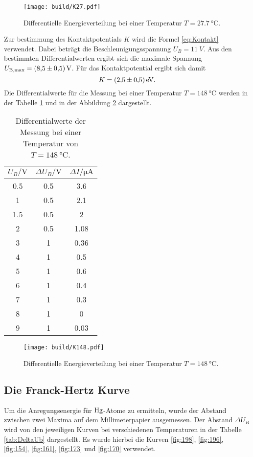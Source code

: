 \begin{figure}[H]
    \centering
    \texttt{[image: build/K27.pdf]}
    \caption{Differentielle Energieverteilung bei einer Temperatur $T = \qty{27.7}{\degreeCelsius}$.}
    \label{fig:K27}
\end{figure}
Zur bestimmung des Kontaktpotentials $K$ wird die Formel \ref{eq:Kontakt} verwendet.
Dabei beträgt die Beschleunigungsspannung $U_B = \qty{11}{V}$.
Aus den bestimmten Differentialwerten ergibt sich die maximale Spannung $U_\text{B,max} = \qty{8.5 \pm 0.5}{V}$.
Für das Kontaktpotential ergibt sich damit 
\begin{equation*}
    K = \qty{2.5 \pm 0.5}{eV}.
\end{equation*}
Die Differentialwerte für die Messung bei einer Temperatur $T = \qty{148}{\degreeCelsius}$ werden in der Tabelle \ref{tab:148} und in der Abbildung \ref{fig:K148} 
dargestellt.
\begin{table}[H]
    \centering
    \caption{Differentialwerte der Messung bei einer Temperatur von $T = \qty{148}{\degreeCelsius}$.}
    \label{tab:148}
    \begin{tabular}{c c c}
        \toprule
        $U_B / \unit{\volt}$ & $\Delta U_B/\unit{\volt}$ & $\Delta I/\unit{\micro\ampere}$  \\
        \midrule
        0.5 & 0.5  & 3.6\\
        1   & 0.5  & 2.1\\
        1.5 & 0.5  & 2\\
        2   & 0.5  & 1.08\\
        3   & 1    & 0.36\\
        4   & 1    & 0.5\\
        5   & 1    & 0.6\\
        6   & 1    & 0.4\\
        7   & 1  & 0.3\\
        8   & 1  & 0\\
        9   & 1  & 0.03\\
        \bottomrule
    \end{tabular}
\end{table}

\begin{figure}[H]
    \centering
    \texttt{[image: build/K148.pdf]}
    \caption{Differentielle Energieverteilung bei einer Temperatur $T = \qty{148}{\degreeCelsius}$.}
    \label{fig:K148}
\end{figure}

\subsection{Die Franck-Hertz Kurve}
Um die Anregungsenergie für $\ce{Hg}$-Atome zu ermitteln, wurde der Abstand zwischen zwei Maxima auf dem Millimeterpapier ausgemessen.
Der Abstand $\Delta U_B$ wird von den jeweiligen Kurven bei verschiedenen Temperaturen in der Tabelle \ref{tab:DeltaUb} dargestellt.
Es wurde hierbei die Kurven \ref{fig:198}, \ref{fig:196}, \ref{fig:154}, \ref{fig:161}, \ref{fig:173} und \ref{fig:170} verwendet.

